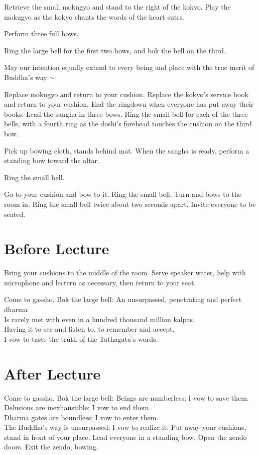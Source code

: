 \documentclass{chantbook}
\begin{document}
\tenken Retrieve the small mokugyo and stand to the right of the kokyo. Play the
mokugyo as the kokyo chants the words of the heart sutra.

\doshi Perform three full bows.

\doan Ring the large bell for the first two bows, and bok the bell on the
third.
\secondBows

\kokyo \heartOfGreatPerfectWisdomSutra

\kokyo May our intention equally extend to every being and place with the true
merit of Buddha's way $\sim$ \largebell

\allBuddhas

\smallBellRolldown

\tenken Replace mokugyo and return to your cushion.
\kokyo Replace the kokyo's service book and return to your cushion.
\doan End the ringdown when everyone has put away their books.
\doshi Lead the sangha in three bows.
\doan Ring the small bell for each of the three bells, with a fourth ring as
the doshi's forehead touches the cushion on the third bow.
\lastBows

\doshi Pick up bowing cloth, stands behind mat. When the sangha is ready,
perform a standing bow toward the altar.

\doan Ring the small bell. \bigspace\smallbell

\doshi Go to your cushion and bow to it.
\doan Ring the small bell. \bigspace\smallbell
\doshi Turn and bows to the room in.
\doan Ring the small bell twice about two seconds apart.
\beSeatedBells
\doshi Invite everyone to be seated.

\section*{Before Lecture}
\sangha Bring your cushions to the middle of the room.
\kokyo Serve speaker water, help with microphone and lectern as necessary,
then return to your seat.

\doshi Come to gassho.
\doan Bok the large bell: \bigspace\bok
\sangha An unsurpassed, penetrating and perfect dharma\\
Is rarely met with even in a hundred thousand million kalpas.\\
Having it to see and listen to, to remember and accept,\\
I vow to taste the truth of the Tathagata's words.

\section*{After Lecture}
\doshi Come to gassho.
\doan Bok the large bell: \bigspace\bok
\sangha Beings are numberless; I vow to save them.\\
Delusions are inexhaustible; I vow to end them.\\
Dharma gates are boundless; I vow to enter them.\\
The Buddha's way is unsurpassed; I vow to realize it.
\sangha Put away your cushions, stand in front of your place.
\doshi Lead everyone in a standing bow.
\tenken Open the zendo doors.
\doshi Exit the zendo, bowing.
\end{document}
